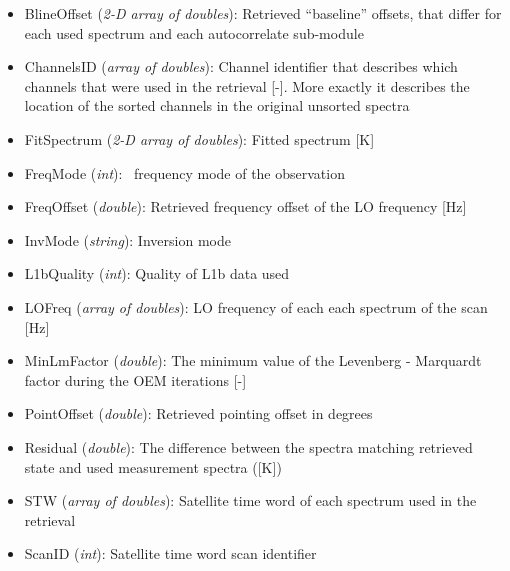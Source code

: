 \begin{itemize}
  \item BlineOffset (\emph{2-D array of doubles}): Retrieved ``baseline''
    offsets, that differ for each used spectrum and each autocorrelate sub-module
  \item ChannelsID (\emph{array of doubles}): Channel identifier that describes
    which channels that were used in the retrieval [-]. More exactly it
    describes the location of the sorted channels in the original unsorted
    spectra
  \item FitSpectrum (\emph{2-D array of doubles}): Fitted spectrum [K]
  \item FreqMode (\emph{int}): \smr\ frequency mode of the observation
  \item FreqOffset (\emph{double}): Retrieved frequency offset of the LO frequency [Hz]
  \item InvMode (\emph{string}): Inversion mode
  \item L1bQuality (\emph{int}): Quality of L1b data used
  \item LOFreq (\emph{array of doubles}): LO frequency of each each spectrum of
    the scan [Hz]
  \item MinLmFactor (\emph{double}): The minimum value of the Levenberg -
    Marquardt factor during the OEM iterations [-]
  \item PointOffset (\emph{double}): Retrieved pointing offset in degrees
  \item Residual (\emph{double}): The difference between the spectra matching
    retrieved state and used measurement spectra ([K])
  \item STW (\emph{array of doubles}): Satellite time word of each spectrum
    used in the retrieval
  \item ScanID (\emph{int}): Satellite time word scan identifier
\end{itemize}


